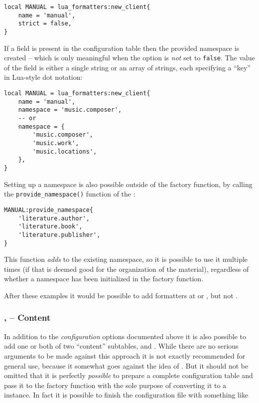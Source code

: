 \documentclass[12pt]{scrartcl}
\begin{document}
\begin{verbatim}
local MANUAL = lua_formatters:new_client{
	name = 'manual',
	strict = false,
}
\end{verbatim}

\noindent If a  field is present in the configuration table
then the provided namespace is created -- which is only meaningful when the
 option is \emph{not} set to \texttt{false}.  The value of the
field is either a single string or an array of strings, each specifying a “key”
in Lua-style dot notation:

\begin{verbatim}
local MANUAL = lua_formatters:new_client{
	name = 'manual',
	namespace = 'music.composer',
	-- or
	namespace = {
		'music.composer',
		'music.work',
		'music.locations',
	},
}
\end{verbatim}

\noindent Setting up a namespace is also possible outside of the factory function, by calling the \texttt{provide_namespace()} function of the :

\begin{verbatim}
MANUAL:provide_namespace{
	'literature.author',
	'literature.book',
	'literature.publisher',
}
\end{verbatim}

\noindent This function \emph{adds} to the existing namespace, so it is possible
to use it multiple times (if that is deemed good for the organization of the
material), regardless of whether a namespace has been initialized in the factory
function.

After these examples it would be possible to add formatters at
 or , but not
.

\subsubsection[Content]{,  -- Content}

In addition to the \emph{configuration} options documented above it is also
possible to add one or both of two “content” subtables,  and
.  While there are no serious arguments to be made against
this approach it is not exactly recommended for general use, because it somewhat
goes against the idea of \luaformatters. But it should not be omitted
that it is perfectly \emph{possible} to prepare a complete configuration table
and pass it to the factory function with the sole purpose of converting it to a
 instance. In fact it is possible to finish the
configuration file with something like
\end{document}
